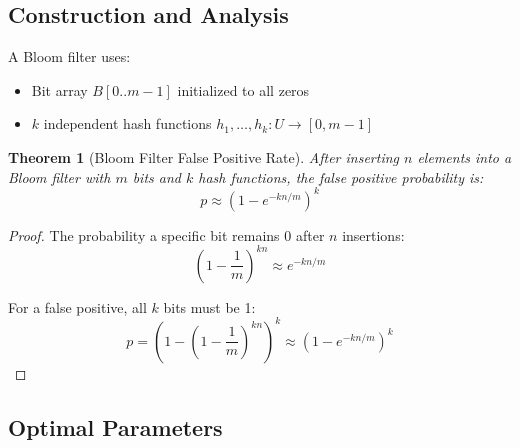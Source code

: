 \documentclass[11pt,twoside,openright]{book}
\theoremstyle{definition}
\theoremstyle{plain}
\newtheorem{theorem}[definition]{Theorem}
\theoremstyle{remark}
\begin{document}
\subsection{Construction and Analysis}

A Bloom filter uses:
\begin{itemize}
    \item Bit array $B[0..m-1]$ initialized to all zeros
    \item $k$ independent hash functions $h_1, \ldots, h_k: U \to [0, m-1]$
\end{itemize}

\begin{algorithm}[H]
\SetAlgoLined
{}


\caption{Bloom Filter Operations}
\end{algorithm}

\begin{theorem}[Bloom Filter False Positive Rate]
After inserting $n$ elements into a Bloom filter with $m$ bits and $k$ hash functions, the false positive probability is:
\begin{equation}
p \approx \left(1 - e^{-kn/m}\right)^k
\end{equation}
\end{theorem}

\begin{proof}
The probability a specific bit remains 0 after $n$ insertions:
\begin{equation}
\left(1 - \frac{1}{m}\right)^{kn} \approx e^{-kn/m}
\end{equation}

For a false positive, all $k$ bits must be 1:
\begin{equation}
p = \left(1 - \left(1 - \frac{1}{m}\right)^{kn}\right)^k \approx \left(1 - e^{-kn/m}\right)^k
\end{equation}
\end{proof}

\subsection{Optimal Parameters}
\end{document}
